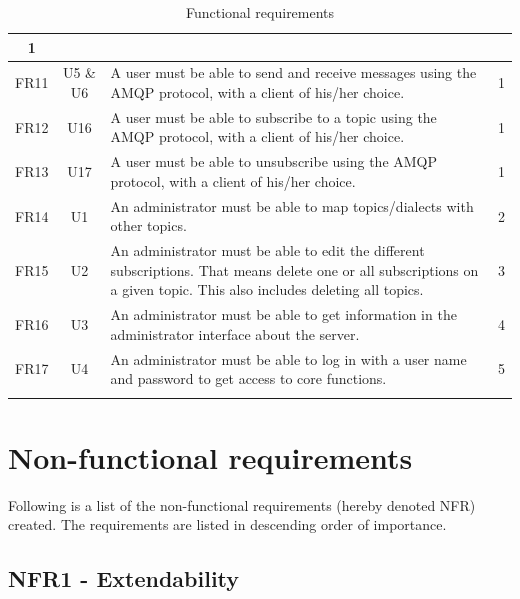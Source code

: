 \begin{longtable}{@{\extracolsep{\fill}}|l|l|p{8cm}|l|@{}}
\multicolumn{1}{c|}{1} \\ \hline
\multicolumn{1}{|c|}{FR11} & \multicolumn{1}{c|}{U5 \& U6} & A user must be able to send and receive messages using the AMQP protocol, with a client of his/her choice. &
\multicolumn{1}{c|}{1} \\ \hline
\multicolumn{1}{|c|}{FR12} & \multicolumn{1}{c|}{U16} & A user must be able to subscribe to a topic using the AMQP protocol, with a client of his/her choice. &
\multicolumn{1}{c|}{1} \\ \hline
\multicolumn{1}{|c|}{FR13} & \multicolumn{1}{c|}{U17} & A user must be able to unsubscribe using the AMQP protocol, with a client of his/her choice. &
\multicolumn{1}{c|}{1} \\ \hline
\multicolumn{1}{|c|}{FR14} & \multicolumn{1}{c|}{U1} & An administrator must be able to map topics/dialects with other topics. &
\multicolumn{1}{c|}{2} \\ \hline
\multicolumn{1}{|c|}{FR15} & \multicolumn{1}{c|}{U2} & An administrator must be able to edit the different subscriptions. That means delete one or all subscriptions on a given topic. This also includes deleting all topics. & \multicolumn{1}{c|}{3} \\ \hline
\multicolumn{1}{|c|}{FR16} & \multicolumn{1}{c|}{U3} & An administrator must be able to get information in the administrator interface about the server. &  \multicolumn{1}{c|}{4} \\ \hline
\multicolumn{1}{|c|}{FR17} & \multicolumn{1}{c|}{U4} & An administrator must be able to log in with a user name and password to get access to core functions. & \multicolumn{1}{c|}{5} \\ \hline
\caption{Functional requirements}
\label{tab:func-requirements}
\end{longtable}

\clearpage

\section{Non-functional requirements}
\label{sec:requirements_engineering-non_functional_requirements}

Following is a list of the non-functional requirements (hereby denoted NFR) created. The requirements are listed in descending order of importance. 

\subsection{NFR1 - Extendability}
\label{subsec:requirements_engineering-non_functional_requirements-extendibility}

